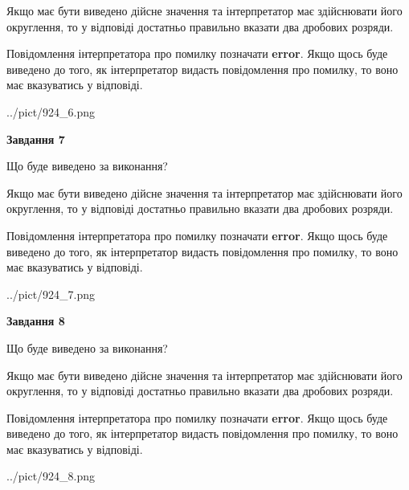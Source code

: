 \documentclass[12pt, ukrainian]{article}
\begin{document}
{\begin {Large}
Якщо має бути виведено дійсне значення та інтерпретатор має здійснювати його округлення, 
то у відповіді достатньо правильно вказати два дробових розряди.

Повідомлення інтерпретатора про помилку позначати \textbf{error}.
Якщо щось буде виведено до того, як інтерпретатор видасть повідомлення про помилку, 
то воно має вказуватись у відповіді. \par

\begin{center}
	{../pict/924_6.png}
\end{center}
\newpage

{\begin {center}\textbf{Завдання 7}\end {center}}\par
Що буде виведено за виконання? \par

Якщо має бути виведено дійсне значення та інтерпретатор має здійснювати його округлення, 
то у відповіді достатньо правильно вказати два дробових розряди.

Повідомлення інтерпретатора про помилку позначати \textbf{error}.
Якщо щось буде виведено до того, як інтерпретатор видасть повідомлення про помилку, 
то воно має вказуватись у відповіді. \par

\begin{center}
	{../pict/924_7.png}
\end{center}
\newpage

{\begin {center}\textbf{Завдання 8}\end {center}}\par
Що буде виведено за виконання? \par

Якщо має бути виведено дійсне значення та інтерпретатор має здійснювати його округлення, 
то у відповіді достатньо правильно вказати два дробових розряди.

Повідомлення інтерпретатора про помилку позначати \textbf{error}.
Якщо щось буде виведено до того, як інтерпретатор видасть повідомлення про помилку, 
то воно має вказуватись у відповіді. \par

\begin{center}
	{../pict/924_8.png}
\end{center}
\newpage


\end{Large}}
\end{document}
